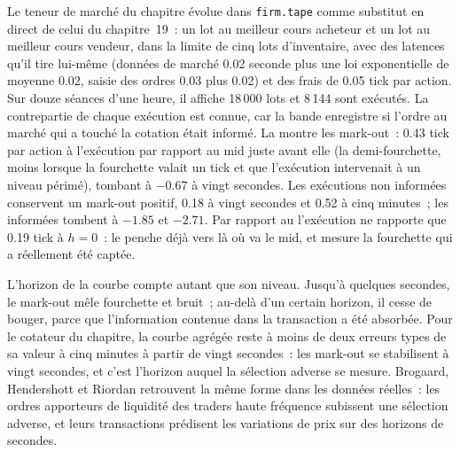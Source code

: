 Le teneur de marché du chapitre évolue dans \texttt{firm.tape} comme substitut en direct de celui du chapitre~19~: un lot au meilleur cours acheteur et un lot au meilleur cours vendeur, dans la limite de cinq lots
d'inventaire, avec des latences qu'il tire lui-même (données de marché 0.02 seconde plus une loi exponentielle de moyenne 0.02, saisie des ordres 0.03 plus 0.02) et des frais de 0.05 tick par
action. Sur douze séances d'une heure, il affiche 18\,000 lots et 8\,144 sont exécutés. La contrepartie de chaque exécution est connue, car la bande enregistre si
l'ordre au marché qui a touché la cotation était informé. La  montre les mark-out~: 0.43 tick par action à l'exécution
par rapport au mid juste avant elle (la demi-fourchette, moins lorsque la fourchette valait un tick et que l'exécution intervenait à un niveau périmé), tombant à $-0.67$ à vingt secondes.
Les exécutions non informées conservent un mark-out positif, 0.18 à vingt secondes et 0.52 à cinq minutes~; les informées tombent à $-1.85$ et $-2.71$. Par rapport au 
l'exécution ne rapporte que 0.19 tick à $h = 0$~: le  penche déjà vers là où va le mid, et mesure la fourchette qui a réellement été captée.

L'horizon de la courbe compte autant que son niveau. Jusqu'à quelques secondes, le mark-out mêle fourchette et bruit~; au-delà d'un certain horizon, il cesse de bouger, parce que
l'information contenue dans la transaction a été absorbée. Pour le cotateur du chapitre, la courbe agrégée reste à moins de deux erreurs types de sa valeur à cinq minutes à partir de vingt
secondes~: les mark-out se stabilisent à vingt secondes, et c'est l'horizon auquel la sélection adverse se mesure. Brogaard, Hendershott et Riordan retrouvent la
même forme dans les données réelles~: les ordres apporteurs de liquidité des traders haute fréquence subissent une sélection adverse, et leurs transactions prédisent les variations de prix sur des horizons de
secondes.

